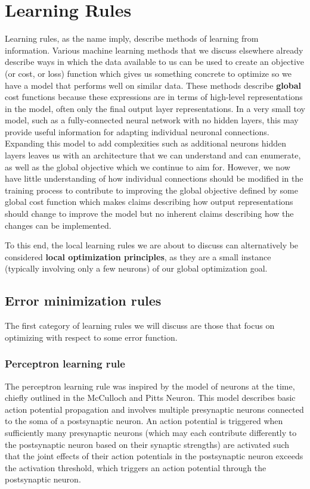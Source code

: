 \documentclass[main]{subfiles}
\begin{document}
\newpage
\section{Learning Rules}

Learning rules, as the name imply, describe methods of learning from information. Various machine learning methods that we discuss elsewhere already describe ways in which the data available to us can be used to create an objective (or cost, or loss) function which gives us something concrete to optimize so we have a model that performs well on similar data. These methods describe \textbf{global} cost functions because these expressions are in terms of high-level representations in the model, often only the final output layer representations. In a very small toy model, such as a fully-connected neural network with no hidden layers, this may provide useful information for adapting individual neuronal connections. Expanding this model to add complexities such as additional neurons hidden layers leaves us with an architecture that we can understand and can enumerate, as well as the global objective which we continue to aim for. However, we now have little understanding of how individual connections should be modified in the training process to contribute to improving the global objective defined by some global cost function which makes claims describing how output representations should change to improve the model but no inherent claims describing how the changes can be implemented.

To this end, the local learning rules we are about to discuss can alternatively be considered \textbf{local optimization principles}, as they are a small instance (typically involving only a few neurons) of our global optimization goal.

\subsection{Error minimization rules}
The first category of learning rules we will discuss are those that focus on optimizing with respect to some error function.

\subsubsection{Perceptron learning rule}

The perceptron learning rule was inspired by the model of neurons at the time, chiefly outlined in the McCulloch and Pitts Neuron. This model describes basic action potential propagation and involves multiple presynaptic neurons connected to the soma of a postsynaptic neuron. An action potential is triggered when sufficiently many presynaptic neurons (which may each contribute differently to the postsynaptic neuron based on their synaptic strengths) are activated such that the joint effects of their action potentials in the postsynaptic neuron exceeds the activation threshold, which triggers an action potential through the postsynaptic neuron.
\end{document}
